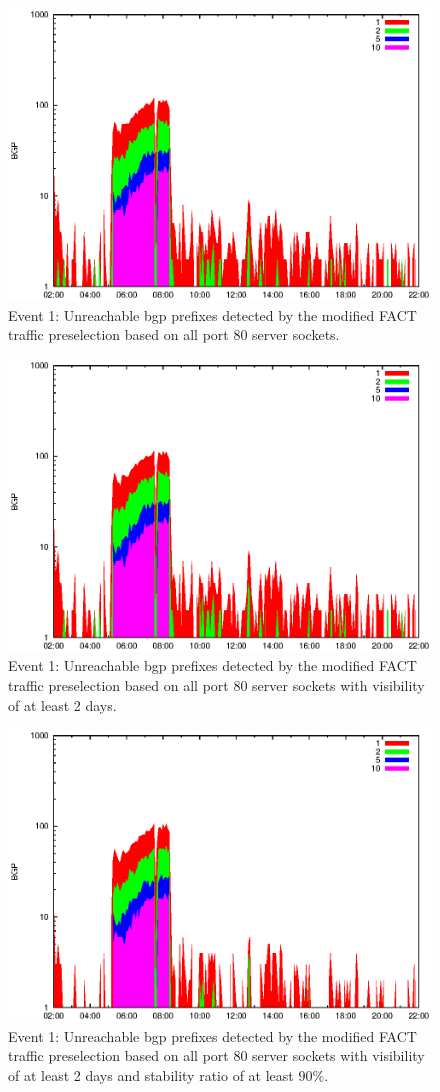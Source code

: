 \begin{figure}
	[p] \centering 
	\includegraphics[width=0.75\linewidth]{images/events/2010_03_25/bgp_log_allPort80SES.eps} \caption{Event 1: Unreachable \gls{bgp} prefixes detected by the modified \gls{FACT} traffic preselection based on all port 80 \glspl{server socket}.} 
	\label{fig:AMS_IX_FACT_allSES80} 
\end{figure}
\begin{figure}
	[p] \centering 
	\includegraphics[width=0.75\linewidth]{images/events/2010_03_25/bgp_log_port80_Set_stab_0_vts_2.eps} \caption{Event 1: Unreachable \gls{bgp} prefixes detected by the modified \gls{FACT} traffic preselection based on all port 80 \glspl{server socket} with visibility of at least 2 days.} 
	\label{fig:AMS_IX_FACT_allSES80VTS2} 
\end{figure}
\begin{figure}
	[p] \centering 
	\includegraphics[width=0.75\linewidth]{images/events/2010_03_25/bgp_log_port80_Set_stab_9_vts_2.eps} \caption{Event 1: Unreachable \gls{bgp} prefixes detected by the modified \gls{FACT} traffic preselection based on all port 80 \glspl{server socket} with visibility of at least 2 days and stability ratio of at least $90\%$.} 
	\label{fig:AMS_IX_FACT_allSES80VTS2STAB9} 
\end{figure}
